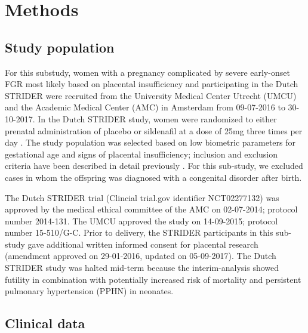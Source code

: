 \documentclass[authordate, empirical]{jote-new-article}
\begin{document}
\section{Methods}







\subsection{Study population}



For this substudy, women with a pregnancy complicated by severe early-onset FGR most likely based on placental insufficiency and participating in the Dutch STRIDER were recruited from the University Medical Center Utrecht (UMCU) and the Academic Medical Center (AMC) in Amsterdam from 09-07-2016 to 30-10-2017. In the Dutch STRIDER study, women were randomized to either prenatal administration of placebo or sildenafil at a dose of 25mg three times per day \parencites{Pels2020}{Pels2017}. The study population was selected based on low biometric parameters for gestational age and signs of placental insufficiency; inclusion and exclusion criteria have been described in detail previously \parencites{Pels2020}{Pels2017}. For this sub-study, we excluded cases in whom the offspring was diagnosed with a congenital disorder after birth.



The Dutch STRIDER trial (Clincial trial.gov identifier NCT02277132) was approved by the medical ethical committee of the AMC on 02-07-2014; protocol number 2014-131. The UMCU approved the study on 14-09-2015; protocol number 15-510/G-C. Prior to delivery, the STRIDER participants in this sub-study gave additional written informed consent for placental research (amendment approved on 29-01-2016, updated on 05-09-2017). The Dutch STRIDER study was halted mid-term because the interim-analysis showed futility in combination with potentially increased risk of mortality and persistent pulmonary hypertension (PPHN) in neonates.







\subsection{Clinical data }
\end{document}
